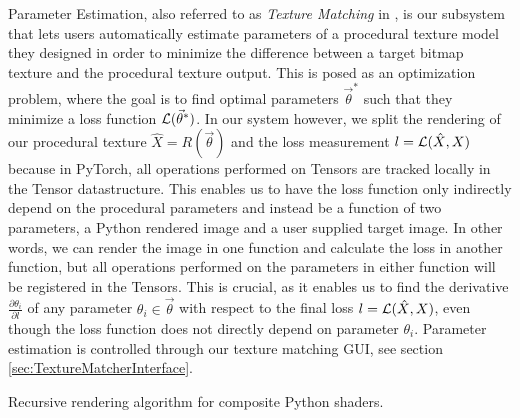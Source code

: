 Parameter Estimation, also referred to as \textit{Texture Matching} in \dipter{}, is our subsystem that lets users automatically estimate parameters of a procedural texture model they designed in order to minimize the difference between a target bitmap texture and the procedural texture output. This is posed as an optimization problem, where the goal is to find optimal parameters $\Vec{\theta}^*$ such that they minimize a loss function $\operatorname{\mathcal{L}}(\Vec{\theta}^*)$. In our system however, we split the rendering of our procedural texture $\hat{X} = R(\vec{\theta})$ and the loss measurement $l=\operatorname{\mathcal{L}}(\hat{X},X)$ because in PyTorch, all operations performed on Tensors are tracked locally in the Tensor datastructure. This enables us to have the loss function only indirectly depend on the procedural parameters and instead be a function of two parameters, a Python rendered image and a user supplied target image. In other words, we can render the image in one function and calculate the loss in another function, but all operations performed on the parameters in either function will be registered in the Tensors. This is crucial, as it enables us to find the derivative $\frac{\partial \theta_i}{\partial l}$ of any parameter $\theta_i \in \vec{\theta}$ with respect to the final loss $l = \operatorname{\mathcal{L}}(\hat{X}, X)$, even though the loss function does not directly depend on parameter $\theta_i$. Parameter estimation is controlled through our texture matching GUI, see section \ref{sec:TextureMatcherInterface}.

\begin{algorithm}
	
	
	\caption{Recursive rendering algorithm for composite Python shaders.}
	\label{alg:PythonCompositeRendering}
\end{algorithm}


